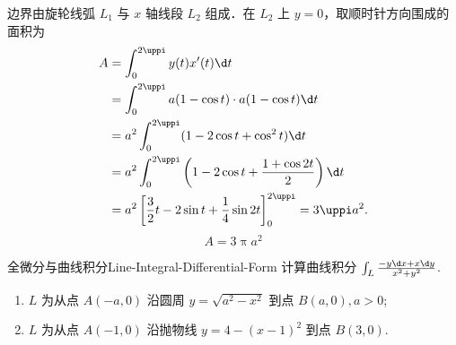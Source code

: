 \begin{solution}
    \begin{center}
    \end{center}
    边界由旋轮线弧 $L_1$ 与 $x$ 轴线段 $L_2$ 组成．在 $L_2$ 上 $y=0$，取顺时针方向围成的面积为
    \begin{equation}\label{eq:cycloid-calc}
        \begin{aligned}
            A & = \int_0^{2\uppi} y(t) x'(t) \d t                                                         \\
              & = \int_0^{2\uppi} a(1 - \cos t) \cdot a(1 - \cos t) \d t                                  \\
              & = a^2 \int_0^{2\uppi} (1 - 2\cos t + \cos^2 t) \d t                                       \\
              & = a^2 \int_0^{2\uppi} \left( 1 - 2\cos t + \frac{1 + \cos 2t}{2} \right) \d t             \\
              & = a^2 \left[ \frac{3}{2}t - 2\sin t + \frac{1}{4}\sin 2t \right]_0^{2\uppi} = 3\uppi a^2.
        \end{aligned}
    \end{equation}
    \begin{equation}
        A = \boxed{3\uppi a^2}
    \end{equation}
\end{solution}

\begin{problem}{全微分与曲线积分}{Line-Integral-Differential-Form}
    计算曲线积分 $\int_{L} \frac{-y \d x + x \d y}{x^2 + y^2}$.
    \begin{enumerate}
        \item $L$ 为从点 $A(-a, 0)$ 沿圆周 $y = \sqrt{a^2 - x^2}$ 到点 $B(a, 0), a > 0$;
        \item $L$ 为从点 $A(-1, 0)$ 沿抛物线 $y = 4 - (x - 1)^2$ 到点 $B(3, 0)$.
    \end{enumerate}
\end{problem}

